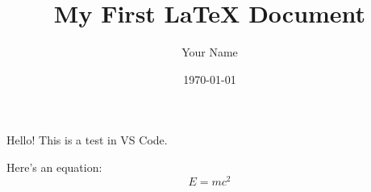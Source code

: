 \documentclass{article}
\title{My First LaTeX Document}
\author{Your Name}
\date{\today}
\begin{document}
\maketitle

Hello! This is a test in VS Code.

Here’s an equation:
\[
E = mc^2
\]
\end{document}
